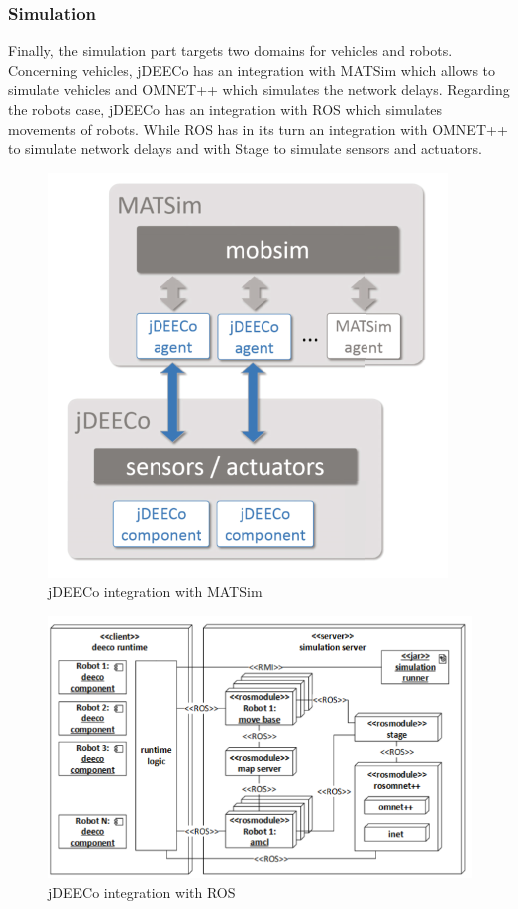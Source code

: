 \subsubsection{Simulation}
Finally, the simulation part targets two domains for vehicles\cite{Kit:2015:AFE:2821357.2821374} and robots\cite{Matena:2016:MPT:2897053.2897065}. Concerning vehicles, jDEECo has an integration with MATSim which allows to simulate vehicles and OMNET++ which simulates the network delays. Regarding the robots case, jDEECo has an integration with ROS which simulates movements of robots. While ROS has in its turn an integration with OMNET++ to simulate network delays and with Stage to simulate sensors and actuators.

\begin{figure}[!htb]
\centering
\includegraphics[scale=0.55]{figures/matsim}
\caption{jDEECo integration with MATSim}
\label{fig:matsim}
\end{figure}

\begin{figure}[!htb]
\centering
\includegraphics[scale=0.65]{figures/ros}
\caption{jDEECo integration with ROS}
\label{fig:ros}
\end{figure}


